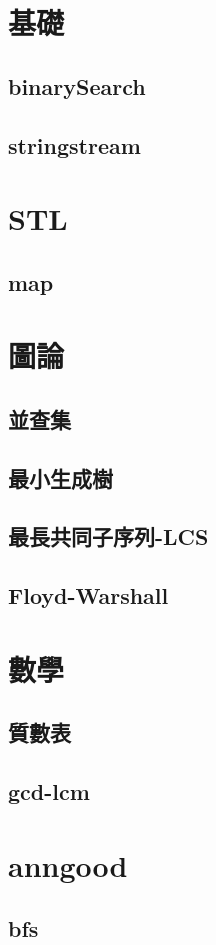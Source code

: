\section{基礎}
    \subsection{binarySearch}
        
    \subsection{stringstream}
        
\section{STL}
    \subsection{map}
        
\section{圖論}
    \subsection{並查集}
        
    \subsection{最小生成樹}
        
    \subsection{最長共同子序列-LCS}
        
    \subsection{Floyd-Warshall}
        
\section{數學}
    \subsection{質數表}
        
    \subsection{gcd-lcm}
        
\section{anngood}
    \subsection{bfs}
        
